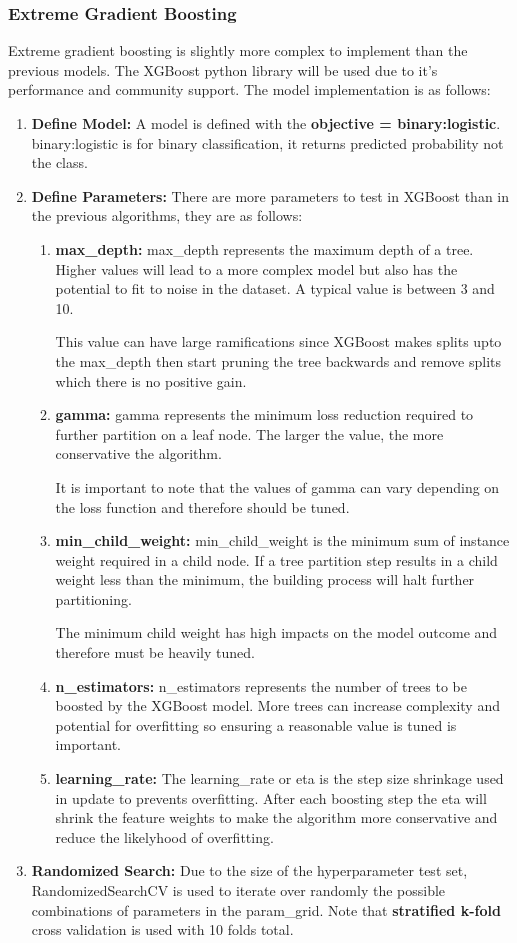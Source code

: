 \documentclass[11pt]{article}
\begin{document}
	\subsubsection{Extreme Gradient Boosting}
		Extreme gradient boosting is slightly more complex to implement than the previous models. The XGBoost python library will be used due to it's performance and community support. The model implementation is as follows:
		
		\begin{enumerate}
			\item \textbf{Define Model:} A model is defined with the \textbf{objective = binary:logistic}. binary:logistic is for binary classification, it returns predicted probability not the class.
			\item \textbf{Define Parameters:} There are more parameters to test in XGBoost than in the previous algorithms, they are as follows:
			\begin{enumerate}
				\item \textbf{max\_depth:} max\_depth represents the maximum depth of a tree. Higher values will lead to a more complex model but also has the potential to fit to noise in the dataset. A typical value is between 3 and 10.
				
				This value can have large ramifications since XGBoost makes splits upto the max\_depth then start pruning the tree backwards and remove splits which there is no positive gain.
				\item \textbf{gamma:} gamma represents the minimum loss reduction required to further partition on a leaf node. The larger the value, the more conservative the algorithm. 
				
				It is important to note that the values of gamma can vary depending on the loss function and therefore should be tuned.
				\item \textbf{min\_child\_weight:} min\_child\_weight is the minimum sum of instance weight required in a child node. If a tree partition step results in a child weight less than the minimum, the building process will halt further partitioning. 
				
				The minimum child weight has high impacts on the model outcome and therefore must be heavily tuned.
				\item \textbf{n\_estimators:} n\_estimators represents the number of trees to be boosted by the XGBoost model. More trees can increase complexity and potential for overfitting so ensuring a reasonable value is tuned is important.
				\item \textbf{learning\_rate:} The learning\_rate or eta is the step size shrinkage used in update to prevents overfitting. After each boosting step the eta will shrink the feature weights to make the algorithm more conservative and reduce the likelyhood of overfitting. 
			\end{enumerate}
			\item \textbf{Randomized Search:} Due to the size of the hyperparameter test set, RandomizedSearchCV is used to iterate over randomly the possible combinations of parameters in the param\_grid. Note that \textbf{stratified k-fold} cross validation is used with 10 folds total. 
	\end{enumerate}
\end{document}
